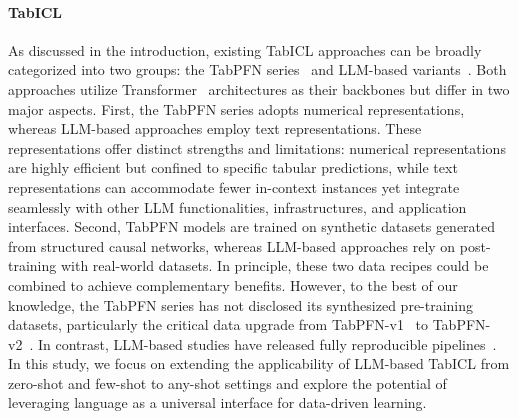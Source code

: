 \paragraph{TabICL}
As discussed in the introduction, existing TabICL approaches can be broadly categorized into two groups: the TabPFN series~\citep{hollmann2023TabPFN,hollmann2025TabPFNv2} and LLM-based variants~\citep{wen2024GTL,gardner2024TabuLa}.
Both approaches utilize Transformer~\citep{vaswani2017attention} architectures as their backbones but differ in two major aspects.
First, the TabPFN series adopts numerical representations, whereas LLM-based approaches employ text representations. These representations offer distinct strengths and limitations: numerical representations are highly efficient but confined to specific tabular predictions, while text representations can accommodate fewer in-context instances yet integrate seamlessly with other LLM functionalities, infrastructures, and application interfaces.
Second, TabPFN models are trained on synthetic datasets generated from structured causal networks, whereas LLM-based approaches rely on post-training with real-world datasets. In principle, these two data recipes could be combined to achieve complementary benefits. However, to the best of our knowledge, the TabPFN series has not disclosed its synthesized pre-training datasets, particularly the critical data upgrade from TabPFN-v1~\citep{hollmann2023TabPFN} to TabPFN-v2~\citep{hollmann2025TabPFNv2}.
In contrast, LLM-based studies have released fully reproducible pipelines~\citep{wen2024GTL,gardner2024TabuLa}.
In this study, we focus on extending the applicability of LLM-based TabICL from zero-shot and few-shot to any-shot settings and explore the potential of leveraging language as a universal interface for data-driven learning.


